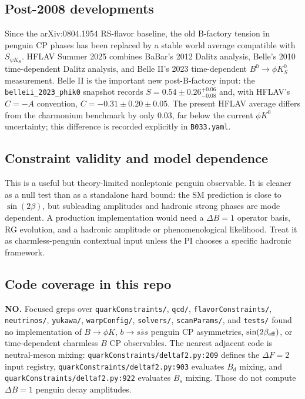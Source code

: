 \subsection*{Post-2008 developments}
Since the arXiv:0804.1954 RS-flavor baseline, the old B-factory tension in
penguin CP phases has been replaced by a stable world average compatible with
\(S_{\psi K_S}\).  HFLAV Summer 2025 combines BaBar's 2012 Dalitz analysis,
Belle's 2010 time-dependent Dalitz analysis, and Belle II's 2023
time-dependent \(B^0\to\phi K_S^0\) measurement.  Belle II is the important
new post-B-factory input: the \texttt{belleii\_2023\_phik0} snapshot records
\(S=0.54\pm0.26^{+0.06}_{-0.08}\) and, with HFLAV's \(C=-A\) convention,
\(C=-0.31\pm0.20\pm0.05\).  The present HFLAV average differs from the
charmonium benchmark by only \(0.03\), far below the current \(\phi K^0\)
uncertainty; this difference is recorded explicitly in \texttt{B033.yaml}.

\subsection*{Constraint validity and model dependence}
This is a useful but theory-limited nonleptonic penguin observable.  It is
cleaner as a null test than as a standalone hard bound: the SM prediction is
close to \(\sin(2\beta)\), but subleading amplitudes and hadronic strong
phases are mode dependent.  A production implementation would need a
\(\Delta B=1\) operator basis, RG evolution, and a hadronic amplitude or
phenomenological likelihood.  Treat it as charmless-penguin contextual input
unless the PI chooses a specific hadronic framework.

\subsection*{Code coverage in this repo}
\textbf{NO.}  Focused greps over \texttt{quarkConstraints/}, \texttt{qcd/},
\texttt{flavorConstraints/}, \texttt{neutrinos/}, \texttt{yukawa/},
\texttt{warpConfig/}, \texttt{solvers/}, \texttt{scanParams/}, and
\texttt{tests/} found no implementation of \(B\to\phi K\),
\(b\to s\bar s s\) penguin CP asymmetries, \(\sin(2\beta_{\rm eff})\), or
time-dependent charmless \(B\) CP observables.  The nearest adjacent code is
neutral-meson mixing: \texttt{quarkConstraints/deltaf2.py:209} defines the
\(\Delta F=2\) input registry, \texttt{quarkConstraints/deltaf2.py:903}
evaluates \(B_d\) mixing, and \texttt{quarkConstraints/deltaf2.py:922}
evaluates \(B_s\) mixing.  Those do not compute \(\Delta B=1\) penguin decay
amplitudes.

